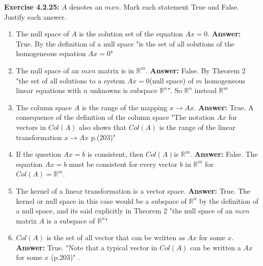 \documentclass{amsart}
\def\RR{{\mathbb R}}
\begin{document}
\noindent\textbf{Exercise 4.2.25: } $A$ denotes an $m x n$. Mark each statement True and False. Justify each answer.\\
\begin{enumerate}

\item The null space of $A$ is the solution set of the equation $Ax=0$.
\noindent \textbf{Answer: } True. By the definition of a null space "is the set of all solutions of the homogeneous equation $Ax=0$"
\vspace{1in}

\item The null space of an $m x n$ matrix is in $\RR^m$.
\noindent \textbf{Answer: } False. By Theorem 2 "the set of all solutions to a system $Ax = 0$(null space) of $m$ homogeneous linear equations with $n$ unknowns is subspace $\RR^n$". So $\RR^n$ instead $\RR^m$
\vspace{1in}


\item The column space $A$ is the range of the mapping $x \to Ax$.
\noindent \textbf{Answer: } True. A consequence of the definition of the column space "The notation $Ax$ for vectors in $Col(A)$ also shows that $Col(A)$ is the range of the linear transformation $x \to Ax$ p.(203)"
\vspace{1in}


\item If the question $Ax=b$ is consistent, then $Col(A)$is $\RR^m$.
\noindent \textbf{Answer: } False. The equation $Ax=b$ must be consistent for every vector $b$ in $\RR^m$ for $Col(A)  = \RR^m$.
\vspace{1in}


\item The kernel of a linear transformation is a vector space. 
\noindent \textbf{Answer: } True. The kernel or null space in this case would be a subspace of $\RR^n$ by the definition of a null space, and its said explicitly in Theorem 2 "the null space of an $m x n$ matrix $A$ is a subspace of $\RR^n$"
\vspace{1in}


\item $Col(A)$ is the set of all vector that can be written as $Ax$ for some $x$.
\noindent \textbf{Answer: } True. "Note that a typical vector in $Col(A)$ can be written a $Ax$ for some $x$ (p.203)" .
\vspace{1in}
\end{enumerate}
\end{document}
